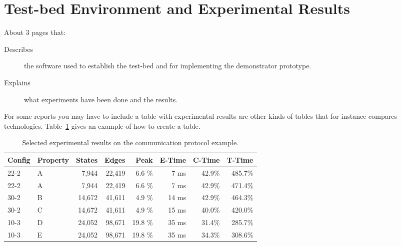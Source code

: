 \section{Test-bed Environment and Experimental Results}
\label{sec:experiments}

About 3 pages that:

\begin{description}

\item[Describes] the software used to establish the test-bed and for implementing the demonstrator prototype.

\item[Explains] what experiments have been done and the results.

\end{description}

For some reports you may have to include a table with experimental
results are other kinds of tables that for instance compares
technologies. Table~\ref{tab:results} gives an example of how to create a table.

\begin{table}
\centering
\begin{tabular}{llrrrrrr}
  Config & Property & States & Edges & Peak & E-Time & C-Time & T-Time
  \\ \hline \hline
22-2 & A   &    7,944  &   22,419  &  6.6  \%  &  7 ms & 42.9\% &  485.7\% \\   
22-2 & A   &    7,944  &   22,419  &  6.6  \%  &  7 ms & 42.9\% &  471.4\% \\   
30-2 & B   &   14,672  &   41,611  &  4.9  \%  & 14 ms & 42.9\% &  464.3\% \\   
30-2 & C   &   14,672  &   41,611  &  4.9  \%  & 15 ms & 40.0\% &  420.0\% \\ \hline
10-3 & D   &   24,052  &   98,671  & 19.8  \%  & 35 ms & 31.4\% &  285.7\% \\   
10-3 & E   &   24,052  &   98,671  & 19.8  \%  & 35 ms & 34.3\% &  308.6\% \\
\hline \hline
\end{tabular}
\caption{Selected experimental results on the communication protocol example.}
\label{tab:results}
\end{table}
